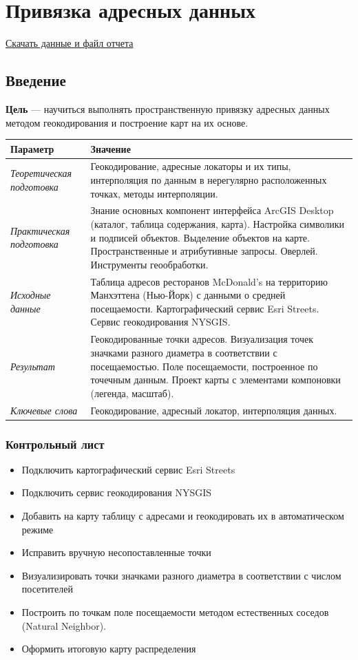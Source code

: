\documentclass[]{book}
\providecommand{\tightlist}{%
  \setlength{\itemsep}{0pt}\setlength{\parskip}{0pt}}
\theoremstyle{definition}
\theoremstyle{definition}
\theoremstyle{definition}
\theoremstyle{remark}
\begin{document}
\hypertarget{geocoding}{%
\chapter{Привязка адресных данных}\label{geocoding}}

\href{http://autolab.geogr.msu.ru/gis/data/Ex09.zip}{Скачать данные и
файл отчета}

\hypertarget{geocoding-intro}{%
\section{Введение}\label{geocoding-intro}}

\textbf{Цель} --- научиться выполнять пространственную привязку адресных
данных методом геокодирования и построение карт на их основе.

\begin{longtable}[]{@{}ll@{}}
\toprule
Параметр & Значение\tabularnewline
\midrule
\endhead
\emph{Теоретическая подготовка} & Геокодирование, адресные локаторы и их
типы, интерполяция по данным в нерегулярно расположенных точках, методы
интерполяции.\tabularnewline
\emph{Практическая подготовка} & Знание основных компонент интерфейса
ArcGIS Desktop (каталог, таблица содержания, карта). Настройка символики
и подписей объектов. Выделение объектов на карте. Пространственные и
атрибутивные запросы. Оверлей. Инструменты геообработки.\tabularnewline
\emph{Исходные данные} & Таблица адресов ресторанов McDonald's на
территорию Манхэттена (Нью-Йорк) с данными о средней посещаемости.
Картографический сервис Esri Streets. Сервис геокодирования
NYSGIS.\tabularnewline
\emph{Результат} & Геокодированные точки адресов. Визуализация точек
значками разного диаметра в соответствии с посещаемостью. Поле
посещаемости, построенное по точечным данным. Проект карты с элементами
компоновки (легенда, масштаб).\tabularnewline
\emph{Ключевые слова} & Геокодирование, адресный локатор, интерполяция
данных.\tabularnewline
\bottomrule
\end{longtable}

\hypertarget{geocoding-control}{%
\subsection{Контрольный лист}\label{geocoding-control}}

\begin{itemize}
\tightlist
\item
  Подключить картографический сервис Esri Streets
\item
  Подключить сервис геокодирования NYSGIS
\item
  Добавить на карту таблицу с адресами и геокодировать их в
  автоматическом режиме
\item
  Исправить вручную несопоставленные точки
\item
  Визуализировать точки значками разного диаметра в соответствии с
  числом посетителей
\item
  Построить по точкам поле посещаемости методом естественных соседов
  (Natural Neighbor).
\item
  Оформить итоговую карту распределения
\end{itemize}
\end{document}
